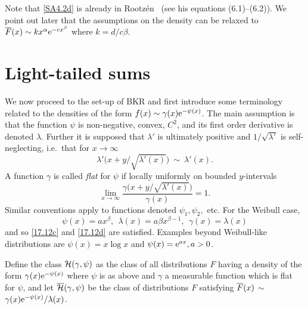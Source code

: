 Note that \eqref{SA4.2d} is already in Rootz\'en~\cite{Rootzen} (see his equations 
(6.1)--(6.2)). We point out later that the assumptions on the density can be relaxed
to $\overline F(x)\sim kx^{\alpha}\mathrm{e}^{-c x^\beta}$ where $k=d/c\beta$.


\section{Light-tailed sums}\label{S:BKR}

We now proceed to the set-up of BKR and first
introduce some terminology related to the densities of the form  $f(x)\sim \gamma(x)\mathrm{e}^{-\psi(x)}$.  The main assumption is that the function $\psi$ is non-negative, convex,
$C^2$,  and its first order derivative is denoted $\lambda$. Further it is supposed that
$\lambda'$ is ultimately positive and $1/\sqrt{\lambda'}$ is self-neglecting, i.e.\ that for $x\to\infty$
\begin{equation}\label{17.12c}
\lambda'\bigl(x+y/\sqrt{\lambda'(x)}\bigr)\ \sim\ \lambda'(x).
\end{equation}
A function $\gamma$ is called \emph{flat} for $\psi$ if locally uniformly on bounded $y$-intervals
\begin{equation}\label{17.12d}
\lim_{x\to \infty}\frac{ \gamma\bigl(x+y/\sqrt{\lambda'(x)}\bigr)}{\gamma(x)}=1.
\end{equation}
Similar conventions apply to functions denoted $\psi_1,\psi_2,$ etc.
For the Weibull case,
\[ \psi(x)=ax^\beta,\ \ \lambda(x)=a\beta x^{\beta-1},\ \ \gamma(x) = \lambda(x) \]
and so \eqref{17.12c} and \eqref{17.12d} are satisfied.
Examples beyond Weibull-like distributions are $\psi(x)=x\log x$ and $\psi(x)=\mathrm{e}^{ax},a>0$. 

Define the class ${\mathcal H}(\gamma,\psi)$ as the class of all distributions $F$ having a density
of the form $\gamma(x)\mathrm{e}^{-\psi(x)}$ where $\psi$ is as above and $\gamma$ a measurable function which is flat for $\psi$,
and let  $\overline{\mathcal H}(\gamma,\psi)$ be the class of  distributions $F$ satisfying 
$\overline F(x)$ $\sim$ $\gamma(x)\mathrm{e}^{-\psi(x)}/\lambda(x)$.

